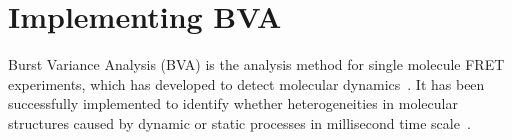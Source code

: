 \section{Implementing BVA}


Burst Variance Analysis (BVA) is the analysis method for single molecule FRET experiments, which has developed to detect molecular dynamics~\cite{Torella_2011}. It has been successfully implemented to identify whether heterogeneities in molecular structures caused by dynamic or static processes in millisecond time scale~\cite{Torella_2011}\cite{Robb_2013}.